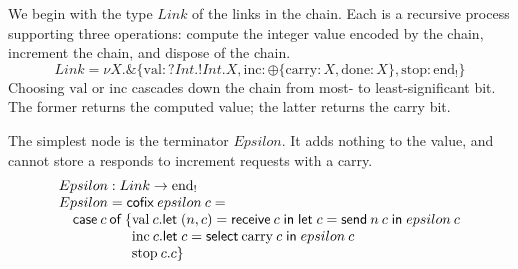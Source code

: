 \documentclass[orivec,envcountsame]{llncs}
\makeatletter
\newcommand{\with}{\mathbin\binampersand}
\newcommand{\gvout}[2]{{!#1.#2}}
\newcommand{\gvin}[2]{{?#1.#2}}
\newcommand{\outterm}{\mathrm{end}_!}
\newcommand{\mkwd}[1]{\mathsf{#1}}
\newcommand{\clabel}[1]{\mathrm{#1}}
\newcommand{\gvsend}[2]{\mkwd{send}\:#1\:#2}
\newcommand{\gvreceive}[1]{\mkwd{receive}\:#1}
\newcommand{\gvlet}[3]{\mkwd{let}\;#1 = #2\;\mkwd{in}\;#3}
\newcommand{\gvselect}[2]{\mkwd{select}\:#1\:#2}
\newcommand{\lrkwd}{\mkwd{cofix}}
\newcommand{\ba}{\begin{array}}
\newcommand{\ea}{\end{array}}
\newcommand{\bl}{\ba[t]{@{}l@{}}}
\newcommand{\el}{\ea}
\makeatother
\begin{document}
We begin with the type $Link$ of the links in the chain. Each is a recursive process supporting
three operations: compute the integer value encoded by the chain, increment the chain, and dispose
of the chain.
%
\[
 Link = \nu X. \with \{ \clabel{val}: \gvin{Int}{\gvout{Int}{X}},
                        \clabel{inc}: \oplus \{ \clabel{carry}: X,
                                                \clabel{done}: X \},
                        \clabel{stop}: \outterm \}
\]
Choosing $\clabel{val}$ or $\clabel{inc}$ cascades down the chain from most- to least-significant
bit. The former returns the computed value; the latter returns the carry bit.

The simplest node is the terminator $Epsilon$. It adds nothing to the value, and cannot store a
responds to increment requests with a carry.
\[
\bl
Epsilon : Link \to \outterm \\
Epsilon = \lrkwd\:epsilon\:c = \\
\quad \mkwd{case}\:c\:\mkwd{of}\:\{
  \bl
  \clabel{val}\:c.
    \bl
    \gvlet{(n,c)}{\gvreceive{c}}{
    \gvlet{c}{\gvsend{n}{c}}{
    epsilon\:c}} \\
    \el \\
  \clabel{inc}\:c.
    \bl
    \gvlet{c}{\gvselect{\clabel{carry}}{c}}{
    epsilon\:c} \\
    \el \\
  \clabel{stop}\:c. c\}  \\
  \el \\
\el
\]
\end{document}
